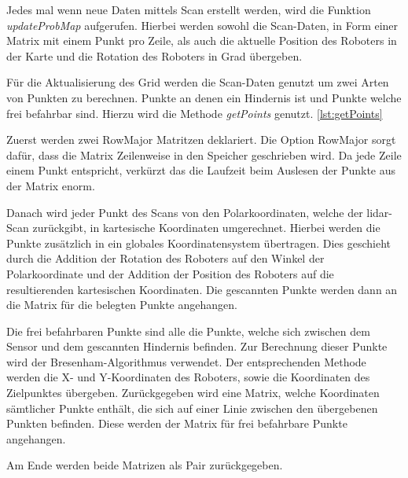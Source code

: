 Jedes mal wenn neue Daten mittels Scan erstellt werden, wird die Funktion \textit{updateProbMap} aufgerufen.
Hierbei werden sowohl die Scan-Daten, in Form einer Matrix mit einem Punkt pro Zeile, 
als auch die aktuelle Position des Roboters in der Karte und die Rotation des Roboters in Grad übergeben.

Für die Aktualisierung des Grid werden die Scan-Daten genutzt um zwei Arten von Punkten zu berechnen.
Punkte an denen ein Hindernis ist und Punkte welche frei befahrbar sind.
Hierzu wird die Methode \textit{getPoints} genutzt. \ref{lst:getPoints}

Zuerst werden zwei RowMajor Matritzen deklariert.
Die Option RowMajor sorgt dafür, dass die Matrix Zeilenweise in den Speicher geschrieben wird.
Da jede Zeile einem Punkt entspricht, verkürzt das die Laufzeit beim Auslesen der Punkte aus der Matrix enorm.

Danach wird jeder Punkt des Scans von den Polarkoordinaten, welche der \ac{lidar}-Scan zurückgibt, in kartesische Koordinaten umgerechnet.
Hierbei werden die Punkte zusätzlich in ein globales Koordinatensystem übertragen.
Dies geschieht durch die Addition der Rotation des Roboters auf den Winkel der Polarkoordinate
und der Addition der Position des Roboters auf die resultierenden kartesischen Koordinaten.
Die gescannten Punkte werden dann an die Matrix für die belegten Punkte angehangen.

Die frei befahrbaren Punkte sind alle die Punkte, welche sich zwischen dem Sensor und dem gescannten Hindernis befinden.
Zur Berechnung dieser Punkte wird der Bresenham-Algorithmus verwendet.
Der entsprechenden Methode werden die X- und Y-Koordinaten des Roboters, sowie die Koordinaten des Zielpunktes übergeben.
Zurückgegeben wird eine Matrix, welche Koordinaten sämtlicher Punkte enthält, die sich auf einer Linie zwischen den übergebenen Punkten befinden.
Diese werden der Matrix für frei befahrbare Punkte angehangen.

Am Ende werden beide Matrizen als Pair zurückgegeben.

